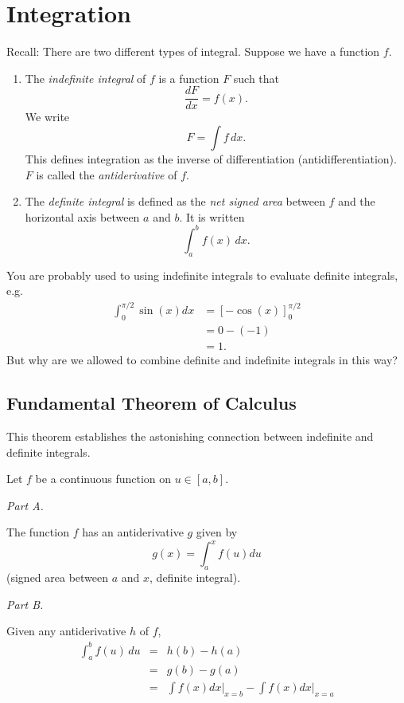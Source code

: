 \section{Integration}

Recall: There are two different types of integral.  Suppose we have a function $f$.
  \begin{enumerate}
    \item The \emph{indefinite integral} of $f$ is a function $F$ such that
      \[
        \frac{dF}{dx} = f(x).
      \]
    We write
      \[
        F = \int f \, dx.
      \]
    This defines integration as the inverse of differentiation (antidifferentiation). $F$ is called the \emph{antiderivative} of $f$.
    \item The \emph{definite integral} is defined as the \emph{net signed area} between $f$ and the horizontal axis between $a$ and $b$. It is written
      \[
        \int_{a}^{b} f(x) \, dx.
      \]
  \end{enumerate}

You are probably used to using indefinite integrals to evaluate definite integrals, e.g.
  \begin{align*}
    \int_{0}^{\pi/2} \sin(x) dx &= [-\cos(x)]_{0}^{\pi/2} \\
    &= 0 - (-1) \\
    &= 1.
  \end{align*}
But why are we allowed to combine definite and indefinite integrals in this way?


\subsection{Fundamental Theorem of Calculus}

This theorem establishes the astonishing connection between indefinite and definite integrals.

\begin{theorem}

Let $f$ be a continuous function on $u \in [a,b]$.

\emph{Part A.}

The function $f$ has an antiderivative $g$ given by
\[
 g(x) = \int_{a}^{x} f(u) du
\]
(signed area between $a$ and $x$, definite integral).

\emph{Part B.}

Given any antiderivative $h$ of $f$,
\begin{eqnarray*}
 \int_{a}^{b} f(u) \, du &=& h(b) - h(a) \\
 &=& g(b) - g(a)\\
&=& \int f(x)dx \Big|_{x=b} - \int f(x)dx \Big|_{x=a}
 \end{eqnarray*}

 \end{theorem}

